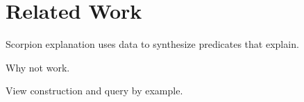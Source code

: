 \section{Related Work}
\label{s:related}


Scorpion explanation uses data to synthesize predicates that explain.

Why not work.

View construction and query by example.

